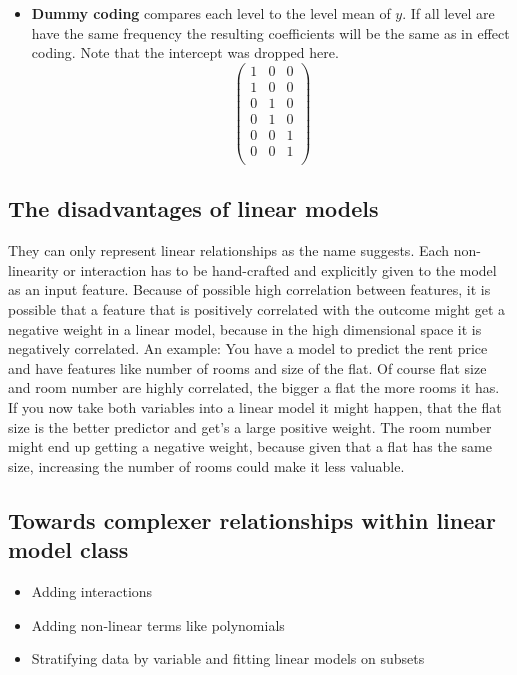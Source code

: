 \documentclass[12pt,]{krantz}
\providecommand{\tightlist}{%
  \setlength{\itemsep}{0pt}\setlength{\parskip}{0pt}}
\theoremstyle{definition}
\theoremstyle{definition}
\theoremstyle{definition}
\theoremstyle{remark}
\begin{document}
\begin{itemize}
\[  \]
\item
  \textbf{Dummy coding} compares each level to the level mean of \(y\).
  If all level are have the same frequency the resulting coefficients
  will be the same as in effect coding. Note that the intercept was
  dropped here. \[
  \begin{pmatrix}
  1 & 0 & 0 \\
  1 & 0 & 0 \\
  0 & 1 & 0 \\
  0 & 1 & 0 \\
  0 & 0 & 1 \\
  0 & 0 & 1 \\
  \end{pmatrix}
  \]
\end{itemize}

\subsection{The disadvantages of linear
models}\label{the-disadvantages-of-linear-models}

They can only represent linear relationships as the name suggests. Each
non-linearity or interaction has to be hand-crafted and explicitly given
to the model as an input feature. Because of possible high correlation
between features, it is possible that a feature that is positively
correlated with the outcome might get a negative weight in a linear
model, because in the high dimensional space it is negatively
correlated. An example: You have a model to predict the rent price and
have features like number of rooms and size of the flat. Of course flat
size and room number are highly correlated, the bigger a flat the more
rooms it has. If you now take both variables into a linear model it
might happen, that the flat size is the better predictor and get's a
large positive weight. The room number might end up getting a negative
weight, because given that a flat has the same size, increasing the
number of rooms could make it less valuable.

\subsection{Towards complexer relationships within linear model
class}\label{towards-complexer-relationships-within-linear-model-class}

\begin{itemize}
\tightlist
\item
  Adding interactions
\item
  Adding non-linear terms like polynomials
\item
  Stratifying data by variable and fitting linear models on subsets
\end{itemize}
\end{document}
